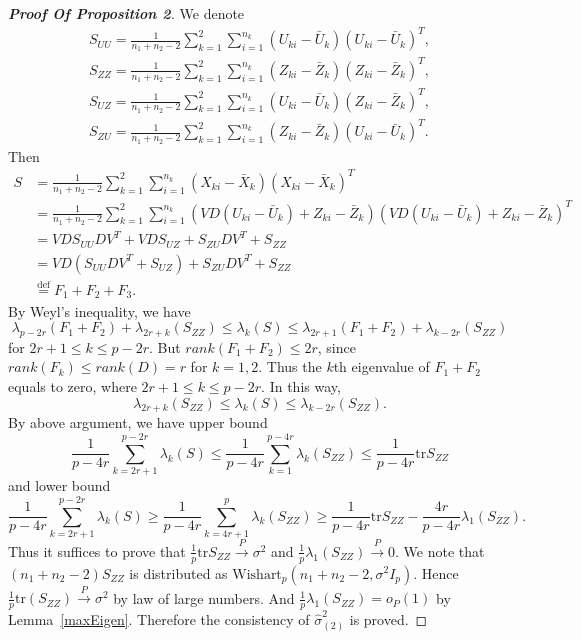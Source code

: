 \begin{proof}[\textbf{Proof Of Proposition 2}]
We denote
\begin{equation}
\begin{aligned}
    S_{UU}=\frac{1}{n_1+n_2-2}\sum_{k=1}^2\sum_{i=1}^{n_k}(U_{ki}-\bar{U}_k){(U_{ki}-\bar{U}_k)}^T,
\\
    S_{ZZ}=\frac{1}{n_1+n_2-2}\sum_{k=1}^2\sum_{i=1}^{n_k}(Z_{ki}-\bar{Z}_k){(Z_{ki}-\bar{Z}_k)}^T,
\\
    S_{UZ}=\frac{1}{n_1+n_2-2}\sum_{k=1}^2\sum_{i=1}^{n_k}(U_{ki}-\bar{U}_k){(Z_{ki}-\bar{Z}_k)}^T,
\\
    S_{ZU}=\frac{1}{n_1+n_2-2}\sum_{k=1}^2\sum_{i=1}^{n_k}(Z_{ki}-\bar{Z}_k){(U_{ki}-\bar{U}_k)}^T.
\end{aligned}
\end{equation}
Then 
\begin{equation}
\begin{aligned}
    S&=\frac{1}{n_1+n_2-2}\sum_{k=1}^2\sum_{i=1}^{n_k}(X_{ki}-\bar{X}_k){(X_{ki}-\bar{X}_k)}^T\\
    &=\frac{1}{n_1+n_2-2}\sum_{k=1}^2\sum_{i=1}^{n_k}(VD(U_{ki}-\bar{U}_k)+Z_{ki}-\bar{Z}_k){(VD(U_{ki}-\bar{U}_k)+Z_{ki}-\bar{Z}_k)}^T\\
&=VDS_{UU}DV^T+VDS_{UZ}+S_{ZU}DV^T+S_{ZZ}\\
&=VD(S_{UU}DV^T+S_{UZ})+S_{ZU}DV^T+S_{ZZ}\\
    &\overset{\textrm{def}}{=}F_1+F_2+F_3.
\end{aligned}
\end{equation}
By Weyl's inequality, we have
\begin{equation}
    \lambda_{p-2r}{(F_1+F_2)}+\lambda_{2r+k}(S_{ZZ})
    \leq \lambda_{k}(S)\leq 
    \lambda_{2r+1}(F_1+F_2)+\lambda_{k-2r}(S_{ZZ})
\end{equation}
for $2r+1\leq k\leq p-2r$.
    But $rank(F_1+F_2)\leq 2r$, since $rank(F_k)\leq rank(D)=r$ for $k=1,2$. Thus the $k$th  eigenvalue of $F_1+F_2$ equals to zero, where $2r+1\leq k\leq p-2r$. In this way,
\begin{equation}
\lambda_{2r+k}(S_{ZZ})\leq \lambda_{k}(S)\leq \lambda_{k-2r}(S_{ZZ}).
\end{equation}
By above argument, we have upper bound
\begin{equation}
    \frac{1}{p-4r}\sum_{k=2r+1}^{p-2r}\lambda_k(S)\leq\frac{1}{p-4r}\sum_{k=1}^{p-4r}\lambda_{k}(S_{ZZ})\leq \frac{1}{p-4r}\mathrm{tr} S_{ZZ}
\end{equation} and lower bound
\begin{equation}
    \frac{1}{p-4r}\sum_{k=2r+1}^{p-2r}\lambda_k(S)\geq\frac{1}{p-4r}\sum_{k=4r+1}^{p}\lambda_{k}(S_{ZZ})\geq \frac{1}{p-4r}\mathrm{tr} S_{ZZ}-\frac{4r}{p-4r}\lambda_1(S_{ZZ}).
\end{equation}
Thus it suffices to  prove that
$\frac{1}{p}\mathrm{tr} S_{ZZ}\xrightarrow{P}\sigma^2$
and
$\frac{1}{p}\lambda_1(S_{ZZ})\xrightarrow{P}0$. 
We note that $(n_1+n_2-2)S_{ZZ}$ is distributed as $\textrm{Wishart}_p(n_1+n_2-2,\sigma^2 I_p)$. Hence $\frac{1}{p}\mathrm{tr}(S_{ZZ})\xrightarrow{P}\sigma^2$ by law of large numbers. And $\frac{1}{p}\lambda_1(S_{ZZ})=o_P(1)$ by Lemma~\ref{maxEigen}. Therefore the consistency of $\hat{\sigma}^2_{(2)}$ is proved.
\end{proof}
